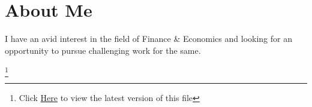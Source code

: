 \documentclass[12pt,a4paper,sans]{moderncv}
\begin{document}
 	\makecvtitle
 	\vspace{-30pt} %
 	\section{\hspace{10em} About Me}{I have an avid interest in the field of Finance \& Economics and looking for an opportunity to pursue challenging work for the same.}	 %
	 \vspace{-10pt} %
	 
	 \vspace{-10pt}
	 
	 \vspace{-10pt} %
	 
	 \vspace{-10pt} %
	 
	 \pagebreak
	 \vspace{-10pt} %
	 
	 \vspace{-10pt} %
	 
	 \vspace{-10pt} %
	 
	 \let\thefootnote\relax\footnote{Click \href{https://docs.google.com/gview?url=https://raw.githubusercontent.com/Vallabh-Desai/Resume/master/src/pdf/resume.pdf&embedded=true}{Here} to view the latest version of this file}
	 


 
\end{document}
